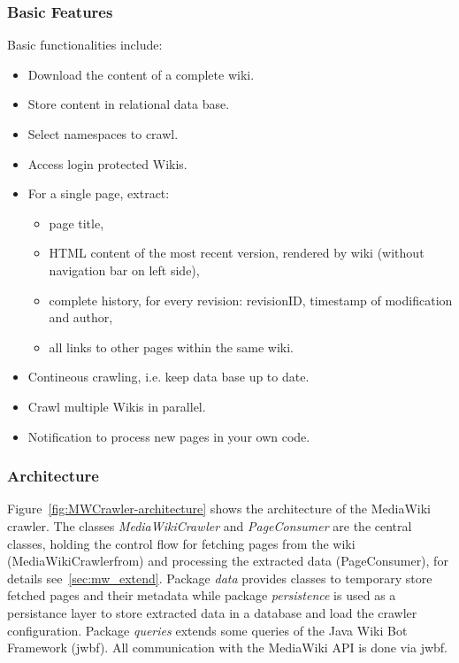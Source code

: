 \documentclass[a4paper,twoside]{book}      %
\begin{document}
\subsubsection{Basic Features}
Basic functionalities include:
\begin{itemize}
\item Download the content of a complete wiki.
\item Store content in relational data base.
\item Select namespaces to crawl.
\item Access login protected Wikis.
\item For a single page, extract: 
	\begin{itemize}
	\item page title,
	\item HTML content of the most recent version, rendered by wiki (without navigation bar on left side),
	\item complete history, for every revision: revisionID, timestamp of modification and author,
	\item all links to other pages within the same wiki.
	\end{itemize}	
\item Contineous crawling, i.e. keep data base up to date.
\item Crawl multiple Wikis in parallel.
\item Notification to process new pages in your own code.
\end{itemize}

\subsubsection{Architecture}

Figure~\ref{fig:MWCrawler-architecture} shows the architecture of the MediaWiki crawler. The classes \emph{MediaWikiCrawler} and \emph{PageConsumer} are the central classes, holding the control flow for fetching pages from the wiki (MediaWikiCrawlerfrom) and processing the extracted data (PageConsumer), for details see~\ref{sec:mw_extend}. Package \emph{data} provides classes to temporary store fetched pages and their metadata while package \emph{persistence} is used as a persistance layer to store extracted data in a database and load the crawler configuration. Package \emph{queries} extends some queries of the Java Wiki Bot Framework (jwbf). All communication with the MediaWiki API is done via jwbf. 
\end{document}

